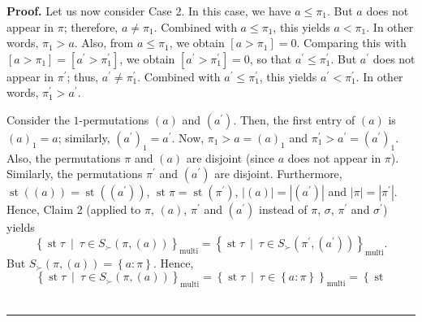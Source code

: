 \documentclass[numbers=enddot,12pt,final,onecolumn,notitlepage]{scrartcl}%
\theoremstyle{definition}
\newenvironment{proof}[1][Proof]{\noindent\textbf{#1.} }{\ \rule{0.5em}{0.5em}}
\newenvironment{verlong}{}{}
\begin{document}
\begin{verlong}
\begin{proof}
Let us now consider Case 2. In this case, we have $a\leq\pi_{1}$. But $a$ does
not appear in $\pi$; therefore, $a\neq\pi_{1}$. Combined with $a\leq\pi_{1}$,
this yields $a<\pi_{1}$. In other words, $\pi_{1}>a$. Also, from $a\leq\pi
_{1}$, we obtain $\left[  a>\pi_{1}\right]  =0$. Comparing this with $\left[
a>\pi_{1}\right]  =\left[  a^{\prime}>\pi_{1}^{\prime}\right]  $, we obtain
$\left[  a^{\prime}>\pi_{1}^{\prime}\right]  =0$, so that $a^{\prime}\leq
\pi_{1}^{\prime}$. But $a^{\prime}$ does not appear in $\pi^{\prime}$; thus,
$a^{\prime}\neq\pi_{1}^{\prime}$. Combined with $a^{\prime}\leq\pi_{1}%
^{\prime}$, this yields $a^{\prime}<\pi_{1}^{\prime}$. In other words,
$\pi_{1}^{\prime}>a^{\prime}$.

Consider the $1$-permutations $\left(  a\right)  $ and $\left(  a^{\prime
}\right)  $. Then, the first entry of $\left(  a\right)  $ is $\left(
a\right)  _{1}=a$; similarly, $\left(  a^{\prime}\right)  _{1}=a^{\prime}$.
Now, $\pi_{1}>a=\left(  a\right)  _{1}$ and $\pi_{1}^{\prime}>a^{\prime
}=\left(  a^{\prime}\right)  _{1}$. Also, the permutations $\pi$ and $\left(
a\right)  $ are disjoint (since $a$ does not appear in $\pi$). Similarly, the
permutations $\pi^{\prime}$ and $\left(  a^{\prime}\right)  $ are disjoint.
Furthermore, $\operatorname{st}\left(  \left(  a\right)  \right)
=\operatorname{st}\left(  \left(  a^{\prime}\right)  \right)  $,
$\operatorname{st} \pi   =\operatorname{st}\left(  \pi^{\prime
}\right)  $, $\left\vert \left(  a\right)  \right\vert =\left\vert \left(
a^{\prime}\right)  \right\vert $ and $\left\vert \pi\right\vert =\left\vert
\pi^{\prime}\right\vert $. Hence, Claim 2 (applied to $\pi$, $\left(
a\right)  $, $\pi^{\prime}$ and $\left(  a^{\prime}\right)  $ instead of $\pi
$, $\sigma$, $\pi^{\prime}$ and $\sigma^{\prime}$) yields%
\begin{equation}
\left\{  \operatorname{st} \tau   \ \mid\ \tau\in S_{\succ
}\left(  \pi,\left(  a\right)  \right)  \right\}  _{\operatorname*{multi}%
}=\left\{  \operatorname{st} \tau   \ \mid\ \tau\in S_{\succ
}\left(  \pi^{\prime},\left(  a^{\prime}\right)  \right)  \right\}
_{\operatorname*{multi}}. \label{pf.prop.LRcomp.equivs.3to4.5}%
\end{equation}
But $S_{\succ}\left(  \pi,\left(  a\right)  \right)  =\left\{  a:\pi\right\}
$. Hence,%
\[
\left\{  \operatorname{st} \tau   \ \mid\ \tau\in S_{\succ
}\left(  \pi,\left(  a\right)  \right)  \right\}  _{\operatorname*{multi}%
}=\left\{  \operatorname{st} \tau   \ \mid\ \tau\in\left\{
a:\pi\right\}  \right\}  _{\operatorname*{multi}}=\left\{  \operatorname{st}
\]
\end{proof}
\end{verlong}
\end{document}
